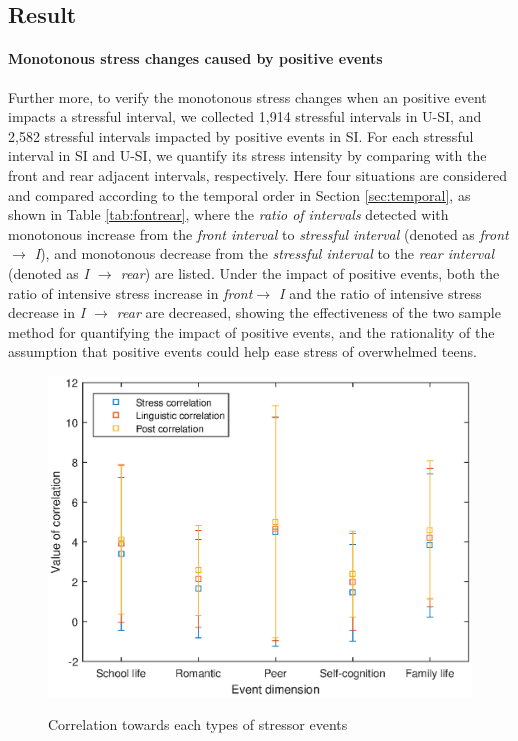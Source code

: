 \subsection{Result}
\paragraph{Monotonous stress changes caused by positive events}
Further more,
to verify the monotonous stress changes when an positive event impacts a stressful interval,
we collected 1,914 stressful intervals in U-SI,
and 2,582 stressful intervals impacted by positive events in SI.
For each stressful interval in SI and U-SI,
we quantify its stress intensity by comparing with the front and rear adjacent intervals, respectively.
Here four situations are considered and compared according to the temporal order in Section \ref{sec:temporal},
as shown in Table \ref{tab:fontrear},
where the \emph{ratio of intervals} detected with monotonous increase from the \emph{front interval} to \emph{stressful interval} (denoted as \emph{front$ \rightarrow$ I}),
and monotonous decrease from the \emph{stressful interval} to the \emph{rear interval} (denoted as \emph{I $\rightarrow$ rear}) are listed.
Under the impact of positive events,
both the ratio of intensive stress increase in \emph{front$ \rightarrow$ I}
and the ratio of intensive stress decrease in \emph{I $\rightarrow$ rear} are decreased,
showing the effectiveness of the two sample method for quantifying the impact of positive events,
and the rationality of the assumption that positive events could help ease stress of overwhelmed teens.

\begin{figure}[H]
\centering
\caption{Correlation towards each types of stressor events}
\includegraphics[width=\linewidth]{figs/correlation2.eps}%
\label{fig:correlation}
\end{figure}
